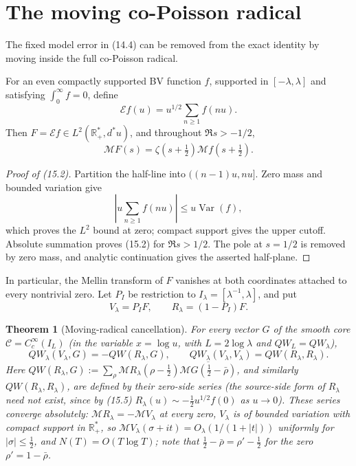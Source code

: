 \documentclass[11pt]{amsart}
\newtheorem{theorem}{Theorem}[section]
\theoremstyle{definition}
\theoremstyle{remark}
\newcommand{\R}{\mathbb R}
\begin{document}
\section{The moving co-Poisson radical}
\label{sec:moving}

The fixed model error in (14.4) can be removed from the exact identity by
moving inside the full co-Poisson radical.

For an even compactly supported BV function \(f\), supported in
\([-\lambda,\lambda]\) and satisfying \(\int_0^\infty f=0\), define
\[
 \mathcal E f(u)=u^{1/2}\sum_{n\ge1}f(nu).
 \tag{15.1}
\]
Then \(F=\mathcal E f\in L^2(\R_+^*,d^*u)\), and throughout
\(\Re s>-1/2\),
\[
 \boxed{
 \mathcal MF(s)=\zeta(s+\tfrac12)\mathcal Mf(s+\tfrac12).}
 \tag{15.2}
\]

\begin{proof}[Proof of (15.2)]
Partition the half-line into \(((n-1)u,nu]\).  Zero mass and bounded
variation give
\[
 \left|u\sum_{n\ge1}f(nu)\right|
 \le u\operatorname {Var}(f),
\]
which proves the \(L^2\) bound at zero; compact support gives the upper
cutoff.  Absolute summation proves (15.2) for \(\Re s>1/2\).  The pole at
\(s=1/2\) is removed by zero mass, and analytic continuation gives the
asserted half-plane.
\end{proof}

In particular, the Mellin transform of \(F\) vanishes at both coordinates
attached to every nontrivial zero.  Let \(P_I\) be restriction to
\(I_\lambda=[\lambda^{-1},\lambda]\), and put
\[
 V_\lambda=P_IF,
 \qquad R_\lambda=(1-P_I)F.
\]

\begin{theorem}[Moving-radical cancellation]
\label{thm:moving-radical}
For every vector \(G\) of the smooth core \(\mathcal C=C_c^\infty(I_L)\)
(in the variable \(x=\log u\), with \(L=2\log\lambda\) and
\(QW_L=QW_\lambda\)),
\[
 \boxed{
 QW_\lambda(V_\lambda,G)=-QW(R_\lambda,G),
 \qquad
 QW_\lambda(V_\lambda,V_\lambda)=QW(R_\lambda,R_\lambda).}
 \tag{15.3}
\]
Here
\(QW(R_\lambda,G):=\sum_\rho\mathcal MR_\lambda(\rho-\tfrac12)
\overline{\mathcal MG(\tfrac12-\bar\rho)}\), and similarly
\(QW(R_\lambda,R_\lambda)\), are defined by their zero-side series (the
source-side form of \(R_\lambda\) need not exist, since by (15.5)
\(R_\lambda(u)\sim-\tfrac12u^{1/2}f(0)\) as \(u\to0\)).  These series
converge absolutely: \(\mathcal MR_\lambda=-\mathcal MV_\lambda\) at every
zero, \(V_\lambda\) is of bounded variation with compact support in
\(\R_+^*\), so \(\mathcal MV_\lambda(\sigma+it)=O_\lambda(1/(1+|t|))\)
uniformly for \(|\sigma|\le\tfrac12\), and \(N(T)=O(T\log T)\); note that
\(\tfrac12-\bar\rho=\rho'-\tfrac12\) for the zero \(\rho'=1-\bar\rho\).
\end{theorem}
\end{document}
